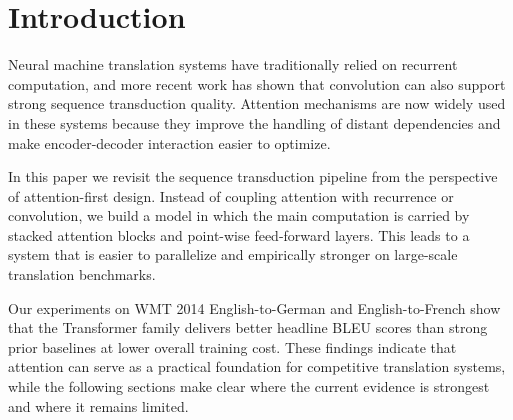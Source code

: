 \section{Introduction}

Neural machine translation systems have traditionally relied on recurrent computation, and more recent work has shown that convolution can also support strong sequence transduction quality. Attention mechanisms are now widely used in these systems because they improve the handling of distant dependencies and make encoder-decoder interaction easier to optimize.

In this paper we revisit the sequence transduction pipeline from the perspective of attention-first design. Instead of coupling attention with recurrence or convolution, we build a model in which the main computation is carried by stacked attention blocks and point-wise feed-forward layers. This leads to a system that is easier to parallelize and empirically stronger on large-scale translation benchmarks.


Our experiments on WMT 2014 English-to-German and English-to-French show that the Transformer family delivers better headline BLEU scores than strong prior baselines at lower overall training cost. These findings indicate that attention can serve as a practical foundation for competitive translation systems, while the following sections make clear where the current evidence is strongest and where it remains limited.
